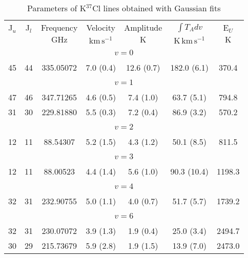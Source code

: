 \begin{table*}[htp]
\centering
\caption{Parameters of K$^{37}$Cl lines obtained with Gaussian fits}
\begin{tabular}{ccccccc}
\label{tab:K37Cl_salt_lines}
 J$_u$ & J$_l$ & Frequency & Velocity & Amplitude & $\int T_A dv$ & E$_U$ \\
  &  & $\mathrm{GHz}$ & $\mathrm{km\,s^{-1}}$ & $\mathrm{K}$ & $\mathrm{K\,km\,s^{-1}}$ & $\mathrm{K}$ \\
\hline
&\vspace{-0.75em}\\
\multicolumn{7}{c}{$v = 0$} \\
\vspace{-0.75em}\\
 45 & 44 & 335.05072 & 7.0 (0.4) & 12.6 (0.7) & 182.0 (6.1) & 370.4 \\
&\vspace{-0.75em}\\
\multicolumn{7}{c}{$v = 1$} \\
\vspace{-0.75em}\\
 47 & 46 & 347.71265 & 4.6 (0.5) & 7.4 (1.0) & 63.7 (5.1) & 794.8 \\
 31 & 30 & 229.81880 & 5.5 (0.3) & 7.2 (0.4) & 86.9 (3.2) & 570.2 \\
&\vspace{-0.75em}\\
\multicolumn{7}{c}{$v = 2$} \\
\vspace{-0.75em}\\
 12 & 11 & 88.54307 & 5.2 (1.5) & 4.3 (1.2) & 50.1 (8.5) & 811.5 \\
&\vspace{-0.75em}\\
\multicolumn{7}{c}{$v = 3$} \\
\vspace{-0.75em}\\
 12 & 11 & 88.00523 & 4.4 (1.4) & 5.6 (1.0) & 90.3 (10.4) & 1198.3 \\
&\vspace{-0.75em}\\
\multicolumn{7}{c}{$v = 4$} \\
\vspace{-0.75em}\\
 32 & 31 & 232.90755 & 5.0 (1.1) & 4.0 (0.7) & 51.7 (5.7) & 1739.2 \\
&\vspace{-0.75em}\\
\multicolumn{7}{c}{$v = 6$} \\
\vspace{-0.75em}\\
 32 & 31 & 230.07072 & 3.9 (1.3) & 1.9 (0.4) & 25.0 (3.4) & 2494.7 \\
 30 & 29 & 215.73679 & 5.9 (2.8) & 1.9 (1.5) & 13.9 (7.0) & 2473.0 \\
\hline
\end{tabular}

\par 
\end{table*}
